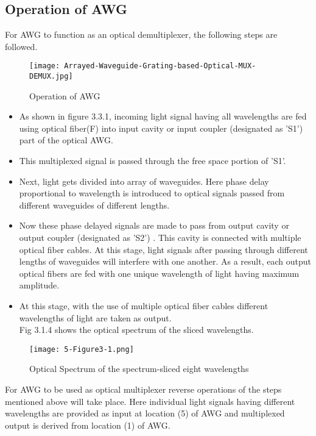 \documentclass[hidelinks, 12pt]{report}
\begin{document}
\subsection*{Operation of AWG}
\justify
For AWG to function as an optical demultiplexer, the following steps are followed.
\begin{figure}[H]
\centering
\texttt{[image: Arrayed-Waveguide-Grating-based-Optical-MUX-DEMUX.jpg]}
\caption[Operation of AWG]{Operation of AWG}
\label{Operation of AWG}
\end{figure}
\begin{itemize}
    \item As shown in figure 3.3.1, incoming light signal having all wavelengths are fed using optical fiber(F) into input cavity or input coupler (designated as 'S1') part of the optical AWG.

\item This multiplexed signal is passed through the free space portion of 'S1'.

\item Next, light gets divided into array of waveguides. Here phase delay proportional to wavelength is introduced to optical signals passed from different waveguides of different lengths.

\item Now these phase delayed signals are made to pass from output cavity or output coupler (designated as 'S2') . This cavity is connected with multiple optical fiber cables. At this stage, light signals after passing through different lengths of waveguides will interfere with one another. As a result, each output optical fibers are fed with one unique wavelength of light having maximum amplitude.

\item At this stage, with the use of multiple optical fiber cables different wavelengths of light are taken as output.
\\ Fig 3.1.4 shows the optical spectrum of the sliced wavelengths.
\end{itemize}
\begin{figure}[H]
\centering
\texttt{[image: 5-Figure3-1.png]}
\caption[Optical Spectrum of the spectrum-sliced eight wavelengths]{Optical Spectrum of the spectrum-sliced eight wavelengths}
\label{Optical Spectrum of the spectrum-sliced eight wavelengths}
\end{figure}
 For AWG to be used as optical multiplexer reverse operations of the steps mentioned above will take place. Here individual light signals having different wavelengths are provided as input at location (5) of AWG and multiplexed output is derived from location (1) of AWG.
\end{document}
